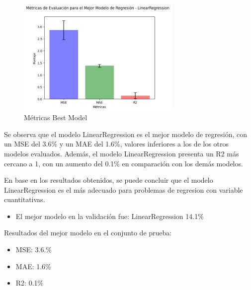 \begin{figure}[H]
    \centering
    \includegraphics[width=0.7\textwidth]{img/compara_algoritmos/metricasBestModelLinearRegression.png}
    \caption{Métricas Best Model}
    \label{fig:metricas_regresion_bestModel}
\end{figure}

Se observa que el modelo LinearRegression es el mejor modelo de regresión, con un MSE del 3.6\% y un MAE del 1.6\%, valores inferiores a los de los otros modelos evaluados. Además, el modelo LinearRegression presenta un R2 más cercano a 1, con un aumento del 0.1\% en comparación con los demás modelos.

En base en los resultados obtenidos, se puede concluir que el modelo LinearRegression es el más adecuado para problemas de regresion con variable cuantitativas.

\begin{itemize}
    \item El mejor modelo en la validación fue: LinearRegression 14.1\%
\end{itemize}

Resultados del mejor modelo en el conjunto de prueba:

\begin{itemize}
    \item MSE: 3.6.\%
    \item MAE: 1.6\%
    \item R2: 0.1\%
\end{itemize}